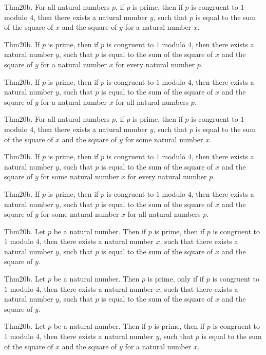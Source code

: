 \documentclass{article}
\begin{document}
Thm20b. For all natural numbers $p$, if $p$ is prime, then if $p$ is congruent to $1$ modulo $4$, then there exists a natural number $y$, such that $p$ is equal to the sum of the square of $x$ and the square of $y$ for a natural number $x$.

Thm20b. If $p$ is prime, then if $p$ is congruent to $1$ modulo $4$, then there exists a natural number $y$, such that $p$ is equal to the sum of the square of $x$ and the square of $y$ for a natural number $x$ for every natural number $p$.

Thm20b. If $p$ is prime, then if $p$ is congruent to $1$ modulo $4$, then there exists a natural number $y$, such that $p$ is equal to the sum of the square of $x$ and the square of $y$ for a natural number $x$ for all natural numbers $p$.

Thm20b. For all natural numbers $p$, if $p$ is prime, then if $p$ is congruent to $1$ modulo $4$, then there exists a natural number $y$, such that $p$ is equal to the sum of the square of $x$ and the square of $y$ for some natural number $x$.

Thm20b. If $p$ is prime, then if $p$ is congruent to $1$ modulo $4$, then there exists a natural number $y$, such that $p$ is equal to the sum of the square of $x$ and the square of $y$ for some natural number $x$ for every natural number $p$.

Thm20b. If $p$ is prime, then if $p$ is congruent to $1$ modulo $4$, then there exists a natural number $y$, such that $p$ is equal to the sum of the square of $x$ and the square of $y$ for some natural number $x$ for all natural numbers $p$.

Thm20b. Let $p$ be a natural number. Then if $p$ is prime, then if $p$ is congruent to $1$ modulo $4$, then there exists a natural number $x$, such that there exists a natural number $y$, such that $p$ is equal to the sum of the square of $x$ and the square of $y$.

Thm20b. Let $p$ be a natural number. Then $p$ is prime, only if if $p$ is congruent to $1$ modulo $4$, then there exists a natural number $x$, such that there exists a natural number $y$, such that $p$ is equal to the sum of the square of $x$ and the square of $y$.

Thm20b. Let $p$ be a natural number. Then if $p$ is prime, then if $p$ is congruent to $1$ modulo $4$, then there exists a natural number $y$, such that $p$ is equal to the sum of the square of $x$ and the square of $y$ for a natural number $x$.
\end{document}

